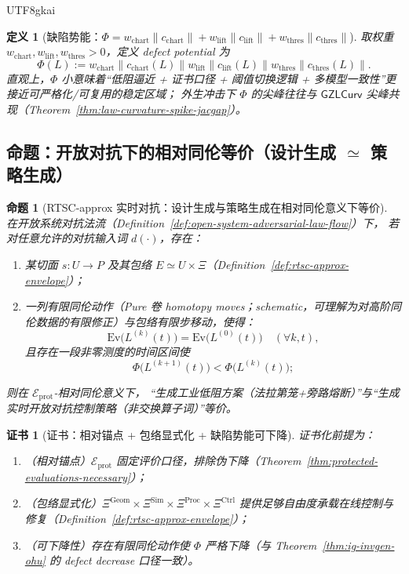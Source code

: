 \documentclass[12pt]{article}
\newtheorem{definition}{定义}[section]
\newtheorem{proposition}{命题}[section]
\newtheorem{certificate}{证书}[section]
\newcommand{\GZLCurv}{\ensuremath{\mathsf{GZLCurv}}}
\begin{document}
\begin{CJK*}{UTF8}{gkai}
\begin{definition}[缺陷势能：$\Phi=w_{\mathrm{chart}}\|c_{\mathrm{chart}}\|+w_{\mathrm{lift}}\|c_{\mathrm{lift}}
  \|+w_{\mathrm{thres}}\|c_{\mathrm{thres}}\|$]
\label{def:rtsc-approx-defect-potential}
取权重 $w_{\mathrm{chart}},w_{\mathrm{lift}},w_{\mathrm{thres}}>0$，定义 defect potential 为
\[
\Phi(L)
:=
w_{\mathrm{chart}}\|c_{\mathrm{chart}}(L)\|
w_{\mathrm{lift}}\|c_{\mathrm{lift}}(L)\|
w_{\mathrm{thres}}\|c_{\mathrm{thres}}(L)\|.
\]
直观上，$\Phi$ 小意味着“低阻逼近 + 证书口径 + 阈值切换逻辑 + 多模型一致性”更接近可严格化/可复用的稳定区域；
外生冲击下 $\Phi$ 的尖峰往往与 $\GZLCurv$ 尖峰共现（Theorem~\ref{thm:law-curvature-spike-jacgap}）。
\end{definition}

\subsection{命题：开放对抗下的相对同伦等价（设计生成 $\simeq$ 策略生成）}

\begin{proposition}[\textsf{RTSC-approx} 实时对抗：设计生成与策略生成在相对同伦意义下等价]
\label{prop:rtsc-approx-design-strategy-equivalence}
在开放系统对抗法流（Definition~\ref{def:open-system-adversarial-law-flow}）下，
若对任意允许的对抗输入词 $d(\cdot)$，存在：
\begin{enumerate}
  \item 某切面 $s:U\to P$ 及其包络 $E\simeq U\times\Xi$（Definition~\ref{def:rtsc-approx-envelope}）；
  \item 一列有限同伦动作（Pure 卷 homotopy moves；schematic，可理解为对高阶同伦数据的有限修正）与包络有限步移动，使得：
  \[
  \mathrm{Ev}\bigl(L^{(k)}(t)\bigr)=\mathrm{Ev}\bigl(L^{(0)}(t)\bigr)\quad(\forall k,t),
  \]
  且存在一段非零测度的时间区间使
  \[
  \Phi\bigl(L^{(k+1)}(t)\bigr)<\Phi\bigl(L^{(k)}(t)\bigr);
  \]
\end{enumerate}
则在 $\mathcal{E}_{\mathrm{prot}}$-相对同伦意义下，
“生成工业低阻方案（法拉第笼+旁路熔断）”与“生成实时开放对抗控制策略（非交换算子词）”等价。
\end{proposition}

\begin{certificate}[证书：相对锚点 + 包络显式化 + 缺陷势能可下降]
\label{cert:rtsc-approx-design-strategy-equivalence}
证书化前提为：
\begin{enumerate}
  \item（相对锚点）$\mathcal{E}_{\mathrm{prot}}$ 固定评价口径，排除伪下降（Theorem~\ref{thm:protected-evaluations-necessary}）；
  \item（包络显式化）$\Xi^{\mathrm{Geom}}\times\Xi^{\mathrm{Sim}}\times\Xi^{\mathrm{Proc}}\times\Xi^{\mathrm{Ctrl}}$
    提供足够自由度承载在线控制与修复（Definition~\ref{def:rtsc-approx-envelope}）；
  \item（可下降性）存在有限同伦动作使 $\Phi$ 严格下降（与 Theorem~\ref{thm:ig-invgen-ohu} 的 defect decrease 口径一致）。
\end{enumerate}
\end{certificate}


\end{CJK*}
\end{document}
